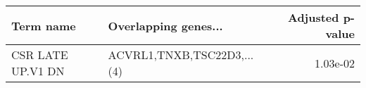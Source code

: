 \begin{tabular}{llr}
\toprule
        Term name &       Overlapping genes... &  Adjusted p-value \\
\midrule
CSR LATE UP.V1 DN & ACVRL1,TNXB,TSC22D3,...(4) &          1.03e-02 \\
\bottomrule
\end{tabular}
